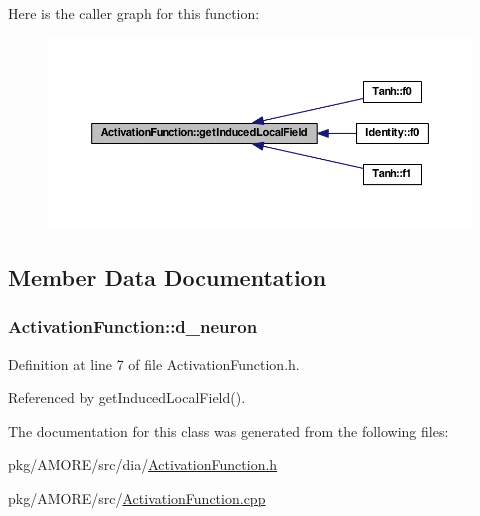 Here is the caller graph for this function:\nopagebreak
\begin{figure}[H]
\begin{center}
\leavevmode
\includegraphics[width=390pt]{class_activation_function_a72f5e70051e79c0e19318ba1b9bb77ec_icgraph}
\end{center}
\end{figure}




\subsection{Member Data Documentation}
\hypertarget{class_activation_function_ae58cc9df29759bbc76816ebfd68e2084}{
\subsubsection[{d\_\-neuron}]{ {\bf ActivationFunction::d\_\-neuron}}}
\label{class_activation_function_ae58cc9df29759bbc76816ebfd68e2084}


Definition at line 7 of file ActivationFunction.h.



Referenced by getInducedLocalField().



The documentation for this class was generated from the following files:\begin{DoxyCompactItemize}
\item 
pkg/AMORE/src/dia/\hyperlink{_activation_function_8h}{ActivationFunction.h}\item 
pkg/AMORE/src/\hyperlink{_activation_function_8cpp}{ActivationFunction.cpp}\end{DoxyCompactItemize}
